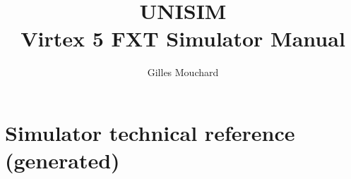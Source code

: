 \documentclass[a4paper,11pt]{article}
\begin{document}
\title{UNISIM\\ Virtex 5 FXT Simulator Manual}
\author{Gilles Mouchard}
\date{}

\maketitle
\tableofcontents
\listoffigures
\listoftables

\newpage


\newpage
\appendix
\appendixpage
\section{Simulator technical reference (generated)}
\label{techref}


\newpage


\end{document}
